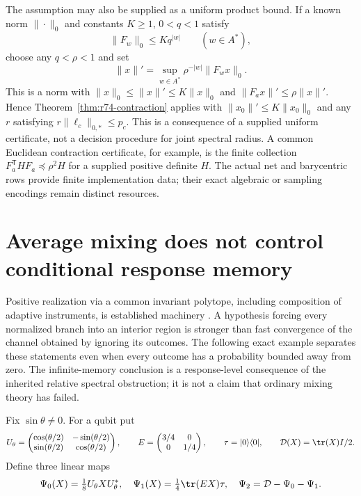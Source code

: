The assumption may also be supplied as a uniform product bound. If a known
norm $\|\cdot\|_0$ and constants $K\ge1$, $0<q<1$ satisfy
\[
 \|F_w\|_0\le Kq^{|w|}\qquad(w\in A^*),
\]
choose any $q<\rho<1$ and set
\[
 \|x\|'=\sup_{w\in A^*}\rho^{-|w|}\|F_wx\|_0.
\]
This is a norm with $\|x\|_0\le\|x\|'\le K\|x\|_0$ and
$\|F_ax\|'\le\rho\|x\|'$. Hence
Theorem~\ref{thm:r74-contraction} applies with
$\|x_0\|'\le K\|x_0\|_0$ and any $r$ satisfying
$r\|\ell_c\|_{0,*}\le p_c$. This is a consequence of a supplied uniform
certificate, not a decision procedure for joint spectral radius. A common
Euclidean contraction certificate, for example, is the finite collection
$F_a^{\mathsf T}HF_a\preceq\rho^2H$ for a supplied positive definite $H$.
The actual net and barycentric rows provide finite implementation data;
their exact algebraic or sampling encodings remain distinct resources.

\section{Average mixing does not control conditional response memory}
\label{sec:r74-mixing-obstruction}

Positive realization via a common invariant polytope, including composition
of adaptive instruments, is established machinery
\cite{MonrasWinter14,Okay26}. A hypothesis forcing every normalized branch
into an interior region is stronger than fast convergence of the channel
obtained by ignoring its outcomes. The following exact example separates
these statements even when every outcome has a probability bounded away
from zero. The infinite-memory conclusion is a response-level consequence
of the inherited relative spectral obstruction; it is not a claim that
ordinary mixing theory has failed.

Fix $\sin\theta\ne0$. For a qubit put
\[
 U_\theta=\begin{pmatrix}
 \cos(\theta/2)&-\sin(\theta/2)\\
 \sin(\theta/2)&\cos(\theta/2)
 \end{pmatrix},\qquad
 E=\begin{pmatrix}3/4&0\\0&1/4\end{pmatrix},\qquad
 \tau=|0\rangle\langle0|,
 \qquad \mathcal D(X)=\tr(X)I/2.
\]
Define three linear maps
\begin{equation}\label{eq:r74-depolarizing-instrument}
 \Psi_0(X)=\tfrac18U_\theta XU_\theta^*,\quad
 \Psi_1(X)=\tfrac14\tr(EX)\tau,\quad
 \Psi_2=\mathcal D-\Psi_0-\Psi_1.
\end{equation}

